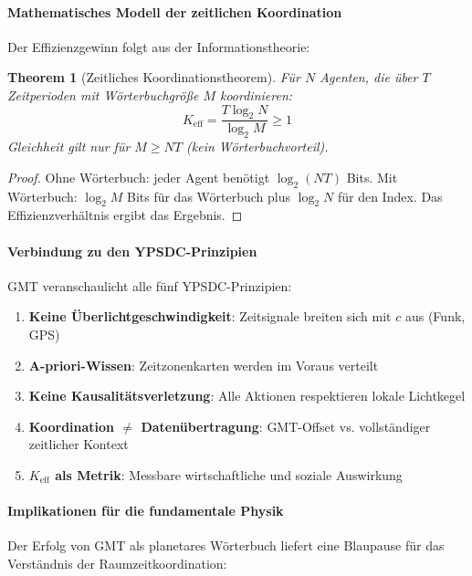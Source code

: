 \documentclass[11pt,a4paper]{article}
\newtheorem{theorem}{Theorem}
\begin{document}
	\paragraph{Mathematisches Modell der zeitlichen Koordination}
	Der Effizienzgewinn folgt aus der Informationstheorie:
	
	\begin{theorem}[Zeitliches Koordinationstheorem]
		Für $N$ Agenten, die über $T$ Zeitperioden mit Wörterbuchgröße $M$ koordinieren:
		\begin{equation}
			K_{\mathrm{eff}} = \frac{T \log_2 N}{\log_2 M} \geq 1
		\end{equation}
		Gleichheit gilt nur für $M \geq NT$ (kein Wörterbuchvorteil).
	\end{theorem}
	
	\begin{proof}
		Ohne Wörterbuch: jeder Agent benötigt $\log_2(NT)$ Bits. Mit Wörterbuch: $\log_2 M$ Bits für das Wörterbuch plus $\log_2 N$ für den Index. Das Effizienzverhältnis ergibt das Ergebnis.
	\end{proof}
	
	\paragraph{Verbindung zu den YPSDC-Prinzipien}
	GMT veranschaulicht alle fünf YPSDC-Prinzipien:
	\begin{enumerate}
		\item \textbf{Keine Überlichtgeschwindigkeit}: Zeitsignale breiten sich mit $c$ aus (Funk, GPS)
		\item \textbf{A-priori-Wissen}: Zeitzonenkarten werden im Voraus verteilt
		\item \textbf{Keine Kausalitätsverletzung}: Alle Aktionen respektieren lokale Lichtkegel
		\item \textbf{Koordination $\neq$ Datenübertragung}: GMT-Offset vs. vollständiger zeitlicher Kontext
		\item \textbf{$K_{\mathrm{eff}}$ als Metrik}: Messbare wirtschaftliche und soziale Auswirkung
	\end{enumerate}
	
	\paragraph{Implikationen für die fundamentale Physik}
	Der Erfolg von GMT als planetares Wörterbuch liefert eine Blaupause für das Verständnis der Raumzeitkoordination:
	
\end{document}
